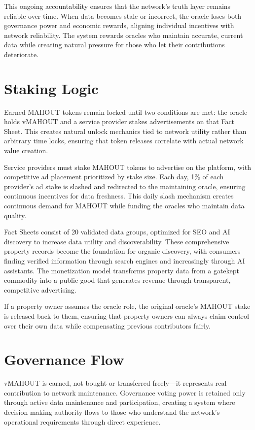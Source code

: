 This ongoing accountability ensures that the network's truth layer remains reliable over time. When data becomes stale or incorrect, the oracle loses both governance power and economic rewards, aligning individual incentives with network reliability. The system rewards oracles who maintain accurate, current data while creating natural pressure for those who let their contributions deteriorate.

\section{Staking Logic}

Earned MAHOUT tokens remain locked until two conditions are met: the oracle holds vMAHOUT and a service provider stakes advertisements on that Fact Sheet. This creates natural unlock mechanics tied to network utility rather than arbitrary time locks, ensuring that token releases correlate with actual network value creation.

Service providers must stake MAHOUT tokens to advertise on the platform, with competitive ad placement prioritized by stake size. Each day, 1\% of each provider's ad stake is slashed and redirected to the maintaining oracle, ensuring continuous incentives for data freshness. This daily slash mechanism creates continuous demand for MAHOUT while funding the oracles who maintain data quality.

Fact Sheets consist of 20 validated data groups, optimized for SEO and AI discovery to increase data utility and discoverability. These comprehensive property records become the foundation for organic discovery, with consumers finding verified information through search engines and increasingly through AI assistants. The monetization model transforms property data from a gatekept commodity into a public good that generates revenue through transparent, competitive advertising.

If a property owner assumes the oracle role, the original oracle's MAHOUT stake is released back to them, ensuring that property owners can always claim control over their own data while compensating previous contributors fairly.

\section{Governance Flow}

vMAHOUT is earned, not bought or transferred freely---it represents real contribution to network maintenance. Governance voting power is retained only through active data maintenance and participation, creating a system where decision-making authority flows to those who understand the network's operational requirements through direct experience.

